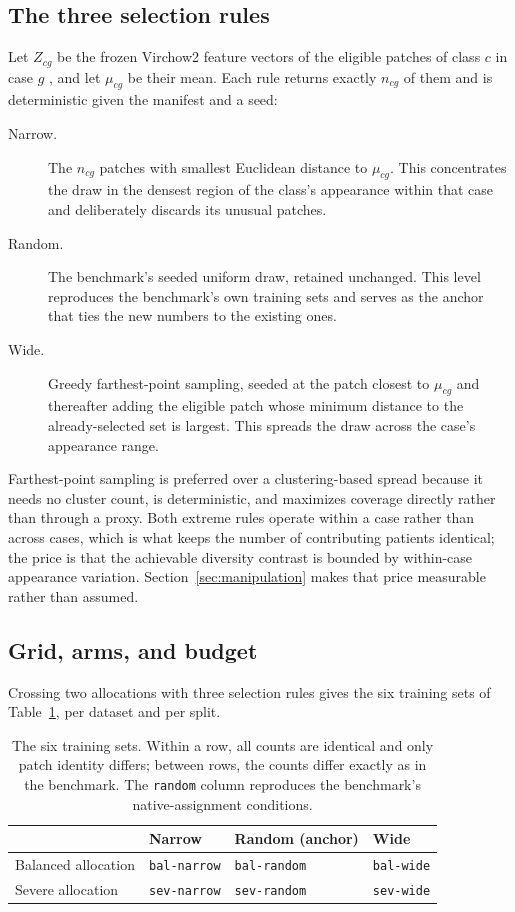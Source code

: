 \documentclass[11pt]{article}
\begin{document}
\subsection{The three selection rules}
\label{sec:rules}
Let $Z_{cg}$ be the frozen Virchow2 feature vectors of the eligible patches of class $c$ in case $g$ \citep{zimmermann2024virchow2}, and let $\mu_{cg}$ be their mean. Each rule returns exactly $n_{cg}$ of them and is deterministic given the manifest and a seed:
\begin{description}
  \item[Narrow.] The $n_{cg}$ patches with smallest Euclidean distance to $\mu_{cg}$. This concentrates the draw in the densest region of the class's appearance within that case and deliberately discards its unusual patches.
  \item[Random.] The benchmark's seeded uniform draw, retained unchanged. This level reproduces the benchmark's own training sets and serves as the anchor that ties the new numbers to the existing ones.
  \item[Wide.] Greedy farthest-point sampling, seeded at the patch closest to $\mu_{cg}$ and thereafter adding the eligible patch whose minimum distance to the already-selected set is largest. This spreads the draw across the case's appearance range.
\end{description}
\noindent Farthest-point sampling is preferred over a clustering-based spread because it needs no cluster count, is deterministic, and maximizes coverage directly rather than through a proxy. Both extreme rules operate within a case rather than across cases, which is what keeps the number of contributing patients identical; the price is that the achievable diversity contrast is bounded by within-case appearance variation. Section~\ref{sec:manipulation} makes that price measurable rather than assumed.

\subsection{Grid, arms, and budget}
\label{sec:grid}
Crossing two allocations with three selection rules gives the six training sets of Table~\ref{tab:grid}, per dataset and per split.

\begin{table}[H]
  \centering
  \small
  \begin{tabular}{@{}llll@{}}
    \toprule
    & Narrow & Random (anchor) & Wide \\
    \midrule
    Balanced allocation & \texttt{bal-narrow} & \texttt{bal-random} & \texttt{bal-wide} \\
    Severe allocation & \texttt{sev-narrow} & \texttt{sev-random} & \texttt{sev-wide} \\
    \bottomrule
  \end{tabular}
  \caption{The six training sets. Within a row, all counts are identical and only patch identity differs; between rows, the counts differ exactly as in the benchmark. The \texttt{random} column reproduces the benchmark's native-assignment conditions.}
  \label{tab:grid}
\end{table}
\end{document}

